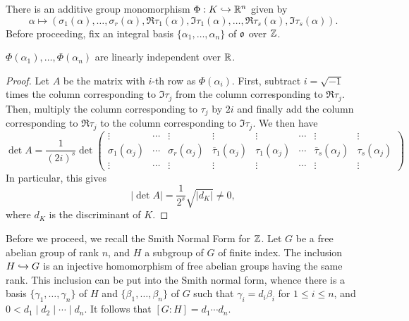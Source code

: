 There is an additive group monomorphism $\Phi: K\hookrightarrow\mathbb{R}^n$ given by 
\begin{equation*}
    \alpha\mapsto\left(\sigma_1(\alpha),\dots,\sigma_r(\alpha),\Re\tau_1(\alpha),\Im\tau_1(\alpha),\dots,\Re\tau_s(\alpha),\Im\tau_s(\alpha)\right).
\end{equation*}
Before proceeding, fix an integral basis $\{\alpha_1,\dots,\alpha_n\}$ of $\mathfrak{o}$ over $\mathbb{Z}$.

\begin{lemma}
    $\Phi(\alpha_1),\dots,\Phi(\alpha_n)$ are linearly independent over $\mathbb{R}$.
\end{lemma}
\begin{proof}
    Let $A$ be the matrix with $i$-th row as $\Phi(\alpha_i)$. First, subtract $i = \sqrt{-1}$ times the column corresponding to $\Im\tau_j$ from the column corresponding to $\Re\tau_j$. Then, multiply the column corresponding to $\tau_j$ by $2i$ and finally add the column corresponding to $\Re\tau_j$ to the column corresponding to $\Im\tau_j$. We then have 
    \begin{equation*}
        \det A = \frac{1}{(2i)^s}\det
        \begin{pmatrix}
            \vdots & \cdots & \vdots & \vdots & \vdots & \cdots & \vdots & \vdots \\
            \sigma_1(\alpha_j) & \cdots & \sigma_r(\alpha_j) & \overline\tau_1(\alpha_j) & \tau_1(\alpha_j) & \cdots & \overline\tau_s(\alpha_j) & \tau_s(\alpha_j)\\
            \vdots & \cdots & \vdots & \vdots & \vdots & \cdots & \vdots & \vdots
        \end{pmatrix}
    \end{equation*}
    In particular, this gives 
    \begin{equation*}
        |\det A| = \frac{1}{2^s}\sqrt{|d_K|}\ne 0,
    \end{equation*}
    where $d_K$ is the discriminant of $K$.
\end{proof}


Before we proceed, we recall the Smith Normal Form for $\mathbb{Z}$. Let $G$ be a free abelian group of rank $n$, and $H$ a subgroup of $G$ of finite index. The inclusion $H\hookrightarrow G$ is an injective homomorphism of free abelian groups having the same rank. This inclusion can be put into the Smith normal form, whence there is a basis $\{\gamma_1,\dots,\gamma_n\}$ of $H$ and $\{\beta_1,\dots,\beta_n\}$ of $G$ such that $\gamma_i = d_i\beta_i$ for $1\le i\le n$, and $0 < d_1\mid d_2\mid\cdots\mid d_n$. It follows that $[G: H] = d_1\cdots d_n$.


